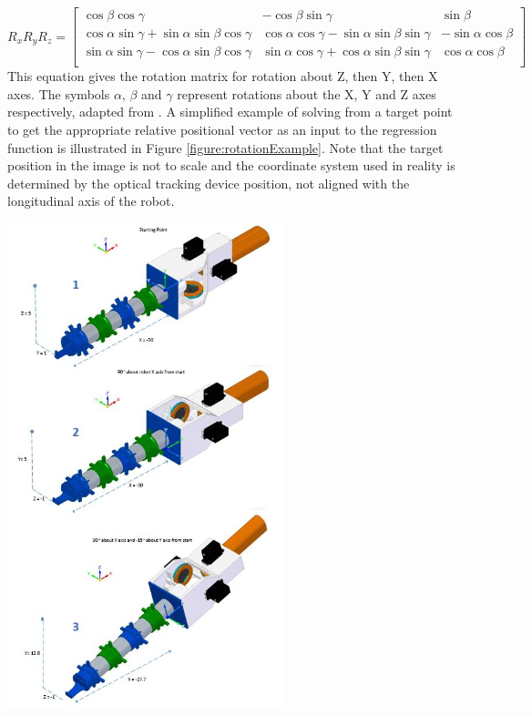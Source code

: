 \documentclass[11pt]{article}
\begin{document}
\begin{equation}\label{equation:rotationMatrix}
R_{x}R_{y}R_{z} = 
\begin{bmatrix*}
\cos\beta\cos\gamma & -\cos\beta\sin\gamma & \sin\beta \\
\cos\alpha\sin\gamma + \sin\alpha\sin\beta\cos\gamma & \cos\alpha\cos\gamma - \sin\alpha\sin\beta\sin\gamma & -\sin\alpha\cos\beta \\
\sin\alpha\sin\gamma - \cos\alpha\sin\beta\cos\gamma & \sin\alpha\cos\gamma + \cos\alpha\sin\beta\sin\gamma & \cos\alpha\cos\beta \\
\end{bmatrix*}
\end{equation}
This equation gives the rotation matrix for rotation about Z, then Y, then X axes. The symbols $\alpha$, $\beta$ and $\gamma$ represent rotations about the X, Y and Z axes respectively, adapted from \cite{3drotation}. A simplified example of solving from a target point to get the appropriate relative positional vector as an input to the regression function is illustrated in Figure \ref{figure:rotationExample}. Note that the target position in the image is not to scale and the coordinate system used in reality is determined by the optical tracking device position, not aligned with the longitudinal axis of the robot. 


\begin{center}
\includegraphics[width=0.6\textwidth]{images/rotationExampleAll.jpg}
\label{figure:rotationExample}
\end{center}
\end{document}
